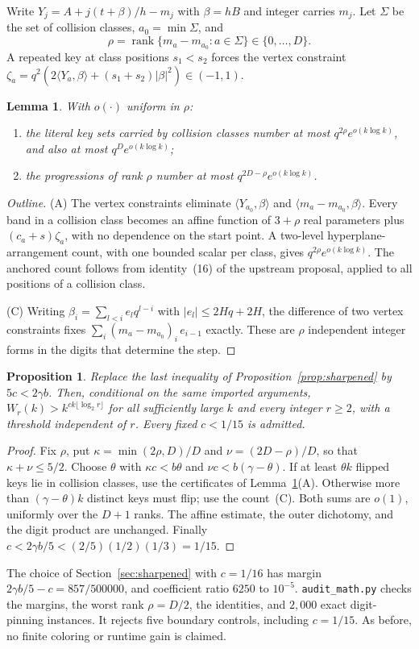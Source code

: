 \documentclass[11pt]{article}
\newtheorem{lemma}{Lemma}
\newtheorem{proposition}{Proposition}
\begin{document}
Write $Y_j=A+j(t+\beta)/h-m_j$ with $\beta=hB$ and integer carries $m_j$.
Let $\Sigma$ be the set of collision classes, $a_0=\min\Sigma$, and
\[
 \rho=\operatorname{rank}\{m_a-m_{a_0}:a\in\Sigma\}\in\{0,\dots,D\}.
\]
A repeated key at class positions $s_1<s_2$ forces the vertex constraint
$\zeta_a=q^2(2\langle Y_a,\beta\rangle+(s_1+s_2)|\beta|^2)\in(-1,1)$.
\begin{lemma}\label{lem:rank-counts}
With $o(\cdot)$ uniform in $\rho$:
\begin{enumerate}
 \item[(A)] the literal key sets carried by collision classes number at most
 $q^{2\rho}e^{o(k\log k)}$, and also at most $q^De^{o(k\log k)}$;
 \item[(C)] the progressions of rank $\rho$ number at most
 $q^{2D-\rho}e^{o(k\log k)}$.
\end{enumerate}
\end{lemma}
\begin{proof}[Outline]
(A) The vertex constraints eliminate $\langle Y_{a_0},\beta\rangle$ and
$\langle m_a-m_{a_0},\beta\rangle$. Every band in a collision class
becomes an affine function of $3+\rho$ real parameters plus
$(c_a+s)\zeta_a$, with no dependence on the start point. A two-level
hyperplane-arrangement count, with one bounded scalar per class, gives
$q^{2\rho}e^{o(k\log k)}$. The anchored count follows from identity~(16)
of the upstream proposal, applied to all positions of a collision class.

(C) Writing $\beta_i=\sum_{l<i}e_lq^{l-i}$ with $|e_l|\le2Hq+2H$, the
difference of two vertex constraints fixes
$\sum_i(m_a-m_{a_0})_i\,e_{i-1}$ exactly. These are $\rho$ independent
integer forms in the digits that determine the step.
\end{proof}
\begin{proposition}\label{prop:rank}
Replace the last inequality of Proposition~\ref{prop:sharpened} by
$5c<2\gamma b$. Then, conditional on the same imported arguments,
$W_r(k)>k^{ck\lfloor\log_2r\rfloor}$ for all sufficiently large $k$ and every
integer $r\ge2$, with a threshold independent of $r$. Every fixed $c<1/15$
is admitted.
\end{proposition}
\begin{proof}
Fix $\rho$, put $\kappa=\min(2\rho,D)/D$ and $\nu=(2D-\rho)/D$, so that
$\kappa+\nu\le5/2$. Choose $\theta$ with $\kappa c<b\theta$ and
$\nu c<b(\gamma-\theta)$. If at least $\theta k$ flipped keys lie in
collision classes, use the certificates of Lemma~\ref{lem:rank-counts}(A).
Otherwise more than $(\gamma-\theta)k$ distinct keys must flip; use the
count~(C). Both sums are $o(1)$, uniformly over the $D+1$ ranks. The
affine estimate, the outer dichotomy, and the digit product are unchanged.
Finally $c<2\gamma b/5<(2/5)(1/2)(1/3)=1/15$.
\end{proof}
The choice of Section~\ref{sec:sharpened} with $c=1/16$ has margin
$2\gamma b/5-c=857/500000$, and coefficient ratio $6250$ to $10^{-5}$.
\texttt{audit\_math.py} checks the margins, the worst rank $\rho=D/2$,
the identities, and $2{,}000$ exact digit-pinning instances. It rejects
five boundary controls, including $c=1/15$. As before, no finite coloring
or runtime gain is claimed.
\end{document}

